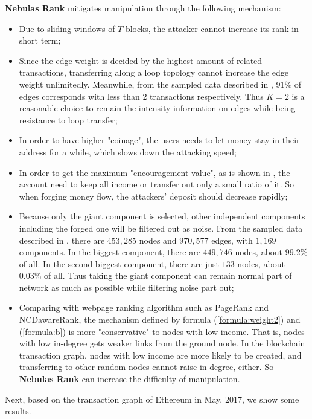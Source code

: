 \textbf{Nebulas Rank} mitigates manipulation through the following mechanism:
\begin{itemize}
	\item Due to sliding windows of $T$ blocks, the attacker cannot increase its rank in short term;
	\item Since the edge weight is decided by the highest amount of related transactions, transferring along a loop topology cannot increase the edge weight unlimitedly. Meanwhile, from the sampled data described in , $91\%$ of edges corresponds with less than 2 transactions respectively. Thus $K=2$ is a reasonable choice to remain the intensity information on edges while being resistance to loop transfer;
	\item In order to have higher "coinage", the users needs to let money stay in their address for a while, which slows down the attacking speed;
	\item In order to get the maximum "encouragement value", as is shown in , the account need to keep all income or transfer out only a small ratio of it. So when forging money flow, the attackers' deposit should decrease rapidly;
	\item Because only the giant component is selected, other independent components including the forged one will be filtered out as noise. From the sampled data described in , there are $453,285$ nodes and $970,577$ edges, with $1,169$ components. In the biggest component, there are $449,746$ nodes, about $99.2\%$ of all. In the second biggest component, there are just $133$ nodes, about $0.03\%$ of all. Thus taking the giant component can remain normal part of network as much as possible while filtering noise part out;
	\item Comparing with webpage ranking algorithm such as PageRank and NCDawareRank\cite{Nikolakopoulos2013}, the mechanism defined by formula (\ref{formula:weight2}) and (\ref{formula:b}) is more "conservative" to nodes with low income. That is, nodes with low in-degree gets weaker links from the ground node. In the blockchain transaction graph, nodes with low income are more likely to be created, and transferring to other random nodes cannot raise in-degree, either. So \textbf{Nebulas Rank} can increase the difficulty of manipulation.
\end{itemize}

Next, based on the transaction graph of Ethereum in May, 2017, we show some results.


